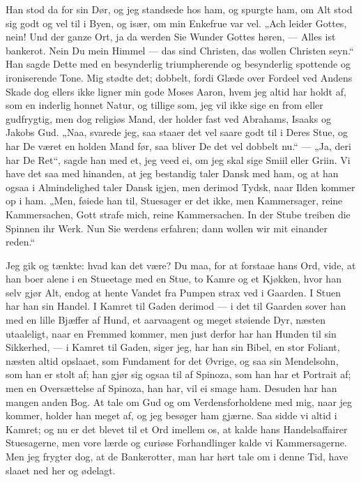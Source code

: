 \documentclass[12pt,a4paper]{book}
\newcommand{\apage}[1]{\marginnote{\footnotesize\textit{[#1]}}}
\begin{document}
Han stod da for sin Dør, og jeg standsede hos ham, og spurgte ham, om
Alt stod sig godt og vel til i Byen, og især, om min Enkefrue var vel.
„Ach leider Gottes, nein! Und der ganze Ort, ja da werden Sie Wunder
Gottes høren, --- Alles ist bankerot. Nein Du mein Himmel --- das sind
Christen, das wollen Christen seyn.“ Han sagde Dette med en besynderlig
triumpherende og besynderlig spottende og ironiserende Tone. Mig stødte
det; dobbelt, fordi Glæde over Fordeel ved Andens Skade dog ellers ikke
ligner min gode Moses Aaron, hvem jeg altid har holdt af, som en inderlig
honnet Natur, og tillige som, jeg vil ikke sige en from eller
gudfrygtig, men dog religiøs Mand, der holder fast ved Abrahams, Isaaks
og Jakobs Gud. „Naa, svarede jeg, saa staaer det vel saare godt til i
Deres Stue, og har De været en holden Mand før, saa bliver De det vel
dobbelt nu.“ --- „Ja, deri har De Ret“, sagde han med et, jeg veed ei,
om jeg skal sige Smiil eller Griin. Vi have det saa med hinanden, at jeg
bestandig
taler \apage{9}  Dansk med ham, og at han ogsaa i Almindelighed taler Dansk igjen,
men derimod Tydsk, naar Ilden kommer op i ham. „Men, føiede han til,
Stuesager er det ikke, men Kammersager, reine Kammersachen, Gott strafe
mich, reine Kammersachen. In der Stube treiben die Spinnen ihr Werk. Nun
Sie werdens erfahren; dann wollen wir mit einander reden.“

Jeg gik og tænkte: hvad kan det være? Du maa, for at forstaae hans Ord,
vide, at han boer alene i en Stueetage med en Stue, to Kamre og et
Kjøkken, hvor han selv gjør Alt, endog at hente Vandet fra Pumpen strax
ved i Gaarden. I Stuen har han sin Handel. I Kamret til Gaden derimod ---
i det til Gaarden sover han med en lille Bjæffer af Hund, et aarvaagent
og meget støiende Dyr, næsten utaaleligt, naar en Fremmed kommer, men
just derfor har han Hunden til sin Sikkerhed, --- i Kamret til Gaden,
siger jeg, har han sin Bibel, en stor Foliant, næsten altid opslaaet, som
Fundament for det Øvrige, og saa sin Mendelsohn, som han er stolt af;
han gjør sig ogsaa til af Spinoza, som han har et Portrait af; men en
Oversættelse af Spinoza, han har, vil ei smage ham. Desuden har han
mangen anden Bog. At tale om Gud og om Verdensforholdene med mig, naar
jeg kommer, holder han meget af, og jeg besøger
ham \apage{10}  gjærne. Saa sidde vi altid i Kamret; og nu er det blevet til et Ord
imellem os, at kalde hans Handelsaffairer Stuesagerne, men vore lærde og
curiøse Forhandlinger kalde vi Kammersagerne. Men jeg frygter dog, at de
Bankerotter, man har hørt tale om i denne Tid, have slaaet ned her og
ødelagt.
\end{document}
